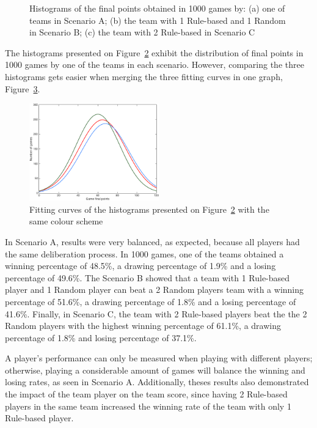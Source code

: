 \begin{figure}[h]
\begin{subfigure}[h]{0.32\textwidth}
                \caption{}
                \label{fig:histC}
        \end{subfigure}
        \caption[Histograms of the final points obtained in the Scenarios A, B and C]{Histograms of the final points obtained in 1000 games by: (a) one of teams in Scenario A; (b) the team with 1 Rule-based and 1 Random in Scenario B; (c) the team with 2 Rule-based in Scenario C}
        \label{fig:histograms}
\end{figure}

The histograms presented on Figure~\ref{fig:histograms} exhibit the distribution of final points in 1000 games by one of the teams in each scenario.
However, comparing the three histograms gets easier when merging the three fitting curves in one graph, Figure~\ref{fig:ABC}.

\begin{figure}[h!]
  \centering
    \includegraphics[width=0.5\textwidth]{./img/4/ABC}
  \caption{Fitting curves of the histograms presented on Figure~\ref{fig:histograms} with the same colour scheme}
\label{fig:ABC}
\end{figure}

In Scenario A, results were very balanced, as expected, because all players had the same deliberation process.
In 1000 games, one of the teams obtained a winning percentage of 48.5\%, a drawing percentage of 1.9\% and a losing percentage of 49.6\%.
The Scenario B showed that a team with 1 Rule-based player and 1 Random player can beat a 2 Random players team with a winning percentage of 51.6\%, a drawing percentage of 1.8\% and a losing percentage of 41.6\%.
Finally, in Scenario C, the team with 2 Rule-based players beat the the 2 Random players with the highest winning percentage of 61.1\%, a drawing percentage of 1.8\% and losing percentage of 37.1\%.

A player's performance can only be measured when playing with different players; otherwise, playing a considerable amount of games will balance the winning and losing rates, as seen in Scenario A.
Additionally, theses results also demonstrated the impact of the team player on the team score, since having 2 Rule-based players in the same team increased the winning rate of the team with only 1 Rule-based player.

